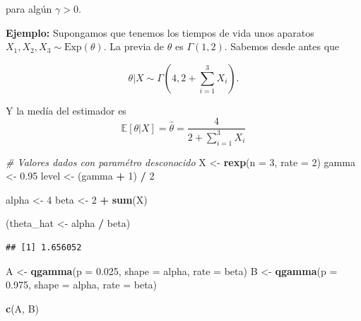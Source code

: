 \documentclass[
  12pt,
]{book}
\newenvironment{Shaded}{\begin{snugshade}}{\end{snugshade}}
\newcommand{\CommentTok}[1]{\textcolor[rgb]{0.56,0.35,0.01}{\textit{#1}}}
\newcommand{\DataTypeTok}[1]{\textcolor[rgb]{0.13,0.29,0.53}{#1}}
\newcommand{\DecValTok}[1]{\textcolor[rgb]{0.00,0.00,0.81}{#1}}
\newcommand{\FloatTok}[1]{\textcolor[rgb]{0.00,0.00,0.81}{#1}}
\newcommand{\KeywordTok}[1]{\textcolor[rgb]{0.13,0.29,0.53}{\textbf{#1}}}
\newcommand{\NormalTok}[1]{#1}
\newcommand{\OperatorTok}[1]{\textcolor[rgb]{0.81,0.36,0.00}{\textbf{#1}}}
\newcommand{\StringTok}[1]{\textcolor[rgb]{0.31,0.60,0.02}{#1}}
\begin{document}
para algún \(\gamma>0\).

\textbf{Ejemplo:} Supongamos que tenemos los tiempos de vida unos aparatos \(X_1, X_2, X_3 \sim \mathrm{Exp}(\theta)\). La previa de \(\theta\) es \(\Gamma(1,2)\). Sabemos desde antes que

\begin{equation*}
\theta \vert X \sim \Gamma(4, 2+ \sum_{i=1}^3 X_i). 
\end{equation*}

Y la medía del estimador es
\begin{equation*}
\mathbb E [\theta\vert X] = \hat \theta = \dfrac{4}{2+ \sum_{i=1}^3 X_i }
\end{equation*}

\begin{Shaded}
\begin{Highlighting}[]
\CommentTok{\# Valores dados con paramétro desconocido}
\NormalTok{X \textless{}{-}}\StringTok{ }\KeywordTok{rexp}\NormalTok{(}\DataTypeTok{n =} \DecValTok{3}\NormalTok{, }\DataTypeTok{rate =} \DecValTok{2}\NormalTok{)}
\NormalTok{gamma \textless{}{-}}\StringTok{ }\FloatTok{0.95}
\NormalTok{level \textless{}{-}}\StringTok{ }\NormalTok{(gamma }\OperatorTok{+}\StringTok{ }\DecValTok{1}\NormalTok{) }\OperatorTok{/}\StringTok{ }\DecValTok{2}

\NormalTok{alpha \textless{}{-}}\StringTok{ }\DecValTok{4}
\NormalTok{beta \textless{}{-}}\StringTok{ }\DecValTok{2} \OperatorTok{+}\StringTok{ }\KeywordTok{sum}\NormalTok{(X)}

\NormalTok{(theta\_hat \textless{}{-}}\StringTok{ }\NormalTok{alpha }\OperatorTok{/}\StringTok{ }\NormalTok{beta)}
\end{Highlighting}
\end{Shaded}

\begin{verbatim}
## [1] 1.656052
\end{verbatim}

\begin{Shaded}
\begin{Highlighting}[]
\NormalTok{A \textless{}{-}}\StringTok{ }\KeywordTok{qgamma}\NormalTok{(}\DataTypeTok{p =} \FloatTok{0.025}\NormalTok{, }\DataTypeTok{shape =}\NormalTok{ alpha, }\DataTypeTok{rate =}\NormalTok{ beta)}
\NormalTok{B \textless{}{-}}\StringTok{ }\KeywordTok{qgamma}\NormalTok{(}\DataTypeTok{p =} \FloatTok{0.975}\NormalTok{, }\DataTypeTok{shape =}\NormalTok{ alpha, }\DataTypeTok{rate =}\NormalTok{ beta)}

\KeywordTok{c}\NormalTok{(A, B)}
\end{Highlighting}
\end{Shaded}
\end{document}
